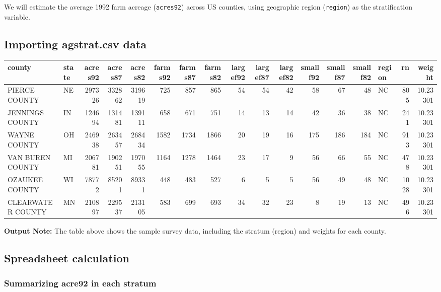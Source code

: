 \documentclass[
  letterpaper,
  DIV=11,
  numbers=noendperiod]{scrreprt}
\renewcommand{\[}{\begin{equation}}
\renewcommand{\]}{\end{equation}}
\begin{document}
We will estimate the average 1992 farm acreage (\texttt{acres92}) across
US counties, using geographic region (\texttt{region}) as the
stratification variable.

\subsection{Importing agstrat.csv
data}\label{importing-agstrat.csv-data}

\begin{table}
\fontsize{12.0pt}{14.0pt}\selectfont
\begin{tabular*}{\linewidth}{@{\extracolsep{\fill}}llrrrrrrrrrrrrlrr}
\toprule
county & state & acres92 & acres87 & acres82 & farms92 & farms87 & farms82 & largef92 & largef87 & largef82 & smallf92 & smallf87 & smallf82 & region & rn & weight \\ 
\midrule\addlinespace[2.5pt]
PIERCE COUNTY & NE & 297326 & 332862 & 319619 & 725 & 857 & 865 & 54 & 54 & 42 & 58 & 67 & 48 & NC & 805 & 10.23301 \\ 
JENNINGS COUNTY & IN & 124694 & 131481 & 139111 & 658 & 671 & 751 & 14 & 13 & 14 & 42 & 36 & 38 & NC & 241 & 10.23301 \\ 
WAYNE COUNTY & OH & 246938 & 263457 & 268434 & 1582 & 1734 & 1866 & 20 & 19 & 16 & 175 & 186 & 184 & NC & 913 & 10.23301 \\ 
VAN BUREN COUNTY & MI & 206781 & 190251 & 197055 & 1164 & 1278 & 1464 & 23 & 17 & 9 & 56 & 66 & 55 & NC & 478 & 10.23301 \\ 
OZAUKEE COUNTY & WI & 78772 & 85201 & 89331 & 448 & 483 & 527 & 6 & 5 & 5 & 56 & 49 & 48 & NC & 1028 & 10.23301 \\ 
CLEARWATER COUNTY & MN & 210897 & 229537 & 213105 & 583 & 699 & 693 & 34 & 32 & 23 & 8 & 19 & 13 & NC & 496 & 10.23301 \\ 
\bottomrule
\end{tabular*}
\end{table}

\textbf{Output Note:} The table above shows the sample survey data,
including the stratum (region) and weights for each county.

\subsection{Spreadsheet calculation}\label{spreadsheet-calculation}

\subsubsection{Summarizing acre92 in each
stratum}\label{summarizing-acre92-in-each-stratum}
\end{document}

